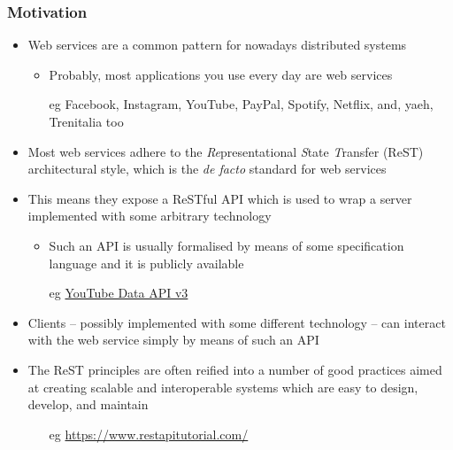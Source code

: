 \documentclass[presentation]{beamer}\mode<presentation>{\usetheme{AMSCesenaPurpleAndGold}}
\begin{document}
\begin{frame}[allowframebreaks]
\frametitle{Motivation}

\begin{itemize}
    \item \alert{Web services} are a common pattern for nowadays distributed systems
    \begin{itemize}
        \item Probably, most applications you use every day are web services
        \item[eg] Facebook, Instagram, YouTube, PayPal, Spotify, Netflix, and, yaeh, \alert{Trenitalia} too
    \end{itemize}

    \vspace{.3cm}

    \item Most web services adhere to the \alert{\emph{Re}presentational \emph{S}tate \emph{T}ransfer} (ReST) architectural style, which is the \emph{de facto} standard for web services

    \vspace{.3cm}

    \item This means they expose a \alert{ReSTful API} which is used to wrap a server implemented with some arbitrary technology
    \begin{itemize}
        \item Such an API is usually formalised by means of some \alert{specification language} and it is publicly available

        \item[eg] \href{https://developers.google.com/apis-explorer/\#p/youtube/v3}{YouTube Data API v3}
    \end{itemize}

    \framebreak

    \item Clients -- possibly implemented with some different technology -- can interact with the web service simply by means of such an API

    \vspace{.3cm}

    \item The ReST principles are often reified into a number of good practices aimed at creating \alert{scalable} and \alert{interoperable} systems which are easy to design, develop, and maintain
    \begin{itemize}
        \item[eg] \url{https://www.restapitutorial.com/}
    \end{itemize}
\end{itemize}
\end{frame}
\end{document}
